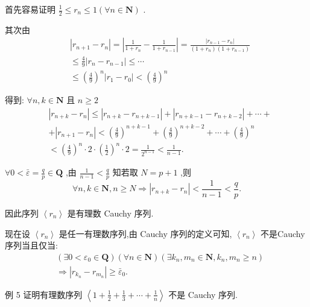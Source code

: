 首先容易证明 $\frac{1}{2} \leq  {r}_{n} \leq  1\left( {\forall n \in  \mathbf{N}}\right)$ .

其次由
\begin{align*}
	&\left| {{r}_{n + 1} - {r}_{n}}\right|  = \left| {\frac{1}{1 + {r}_{n}} - \frac{1}{1 + {r}_{n - 1}}}\right|  = \frac{\left| {r}_{n - 1} - {r}_{n}\right| }{\left( {1 + {r}_{n}}\right) \left( {1 + {r}_{n - 1}}\right) }\\
	&\leq  \frac{4}{9}\left| {{r}_{n} - {r}_{n - 1}}\right|  \leq  \cdots\\
	&\leq  {\left( \frac{4}{9}\right) }^{n}\left| {{r}_{1} - {r}_{0}}\right|  < {\left( \frac{4}{9}\right) }^{n}
\end{align*}

得到: $\forall n,k \in  \mathbf{N}$ 且 $n \geq  2$
\begin{align*}
	&\left| {{r}_{n + k} - {r}_{n}}\right|  \leq  \left| {{r}_{n + k} - {r}_{n + k - 1}}\right|  + \left| {{r}_{n + k - 1} - {r}_{n + k - 2}}\right|  + \cdots  +\\
	&+ \left| {{r}_{n + 1} - {r}_{n}}\right|  < {\left( \frac{4}{9}\right) }^{n + k - 1} + {\left( \frac{4}{9}\right) }^{n + k - 2} + \cdots  + {\left( \frac{4}{9}\right) }^{n}\\
	&< {\left( \frac{4}{9}\right) }^{n} \cdot  2 \cdot  {\left( \frac{1}{2}\right) }^{n} \cdot  2 = \frac{1}{{2}^{n - 1}} < \frac{1}{n - 1}.
\end{align*}

$\forall 0 < \bar{\varepsilon } = \frac{q}{p} \in  \mathbf{Q}$ ,由 $\frac{1}{n - 1} < \frac{q}{p}$ 知若取 $N = p + 1$ ,则
$$\forall n,k \in  \mathbf{N},n \geq  N \Rightarrow  \left| {{r}_{n + k} - {r}_{n}}\right|  < \frac{1}{n - 1} < \frac{q}{p}.$$

因此序列 $\left\langle  {r}_{n}\right\rangle$ 是有理数 Cauchy 序列.

现在设 $\left\langle  {r}_{n}\right\rangle$ 是任一有理数序列,由 Cauchy 序列的定义可知, $\left\langle  {r}_{n}\right\rangle$ 不是Cauchy序列当且仅当:
\begin{align*}
	&\left( {\exists 0 < {\varepsilon }_{0} \in  \mathbf{Q}}\right) \left( {\forall n \in  \mathbf{N}}\right) \left( {\exists {k}_{n},{m}_{n} \in  \mathbf{N},{k}_{n},{m}_{n} \geq  n}\right)\\
	&\Rightarrow  \left| {{r}_{{k}_{n}} - {r}_{{m}_{n}}}\right|  \geq  {\bar{\varepsilon }}_{0}.
\end{align*}

例 5 证明有理数序列 $\left\langle  {1 + \frac{1}{2} + \frac{1}{3} + \cdots  + \frac{1}{n}}\right\rangle$ 不是 Cauchy 序列.

